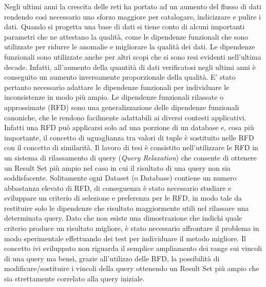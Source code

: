 Negli ultimi anni la crescita delle reti ha portato ad un aumento del flusso di dati rendendo così necessario uno sforzo maggiore per catalogare, indicizzare e pulire i dati. 
Quando si progetta una base di dati si tiene conto di alcuni importanti parametri che ne attestano la qualità, come le dipendenze funzionali che sono utilizzate per ridurre le anomalie e migliorare la qualità dei dati.
Le dipendenze funzionali sono utilizzate anche per altri scopi che si sono resi evidenti nell’ultima decade. Infatti,  all’aumento della quantità di dati verificatosi negli ultimi anni è conseguito un aumento inversamente proporzionale della qualità. E' stato pertanto necessario adattare le dipendenze funzionali per individuare le inconsistenze in modo più ampio.
Le dipendenze funzionali rilassate o approssimate (RFD) sono una generalizzazione delle dipendenze funzionali canoniche,  che le rendono facilmente adattabili ai diversi contesti applicativi. Infatti una RFD può applicarsi solo ad una porzione di un database e, cosa più importante, il concetto di uguaglianza tra valori di tuple è sostituito nelle RFD  con il concetto di similarità. 
Il lavoro di tesi è consistito nell’utilizzare le RFD in un sistema di rilassamento di query (\emph{Query Relaxation}) che consente di ottenere un Result Set più ampio nel caso in cui il risultato di una query non sia soddisfacente. Solitamente ogni Dataset (o Database) contiene un numero abbastanza elevato di RFD, di conseguenza è stato necessario studiare e sviluppare un criterio di selezione e preferenza per le RFD, in modo tale da restituire solo le dipendenze che risultato maggiormente utili nel rilassare una determinata query. Dato che non esiste una dimostrazione che indichi quale criterio produce un risultato migliore, è stato necessario affrontare il problema in modo sperimentale effettuando dei test per individuare il metodo migliore.
Il concetto ivi sviluppato non riguarda il semplice ampliamento dei range sui vincoli di una query ma bensì, grazie all'utilizzo delle RFD, la possibilità di modificare/sostituire i vincoli della query ottenendo un Result Set più ampio che sia strettamente correlato alla query iniziale.